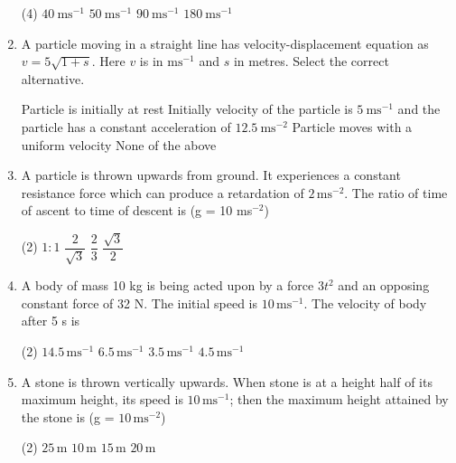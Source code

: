 \documentclass{article}
\renewcommand{\frac}[2]{\dfrac{#1}{#2}}
\begin{document}
\begin{enumerate}
    \begin{tasks}(4)
        \task \(40\ \text{ms}^{-1}\)
        \task \(50\ \text{ms}^{-1}\)
        \task \(90\ \text{ms}^{-1}\)
        \task \(180\ \text{ms}^{-1}\)
    \end{tasks}

    \item A particle moving in a straight line has velocity-displacement equation as \(v = 5\sqrt{1 + s}\). Here \(v\) is in \(\text{ms}^{-1}\) and \(s\) in metres. Select the correct alternative.
    \begin{tasks}
        \task Particle is initially at rest
        \task Initially velocity of the particle is \(5\ \text{ms}^{-1}\) and the particle has a constant acceleration of \(12.5\ \text{ms}^{-2}\)
        \task Particle moves with a uniform velocity
        \task None of the above
    \end{tasks}

    \item A particle is thrown upwards from ground. It experiences a constant resistance force which can produce a retardation of \(2 \, \text{ms}^{-2}\). The ratio of time of ascent to time of descent is (g = 10 ms\(^{-2}\)) 
    \begin{tasks}(2) %
        \task \(1 : 1\)
        \task \( \frac{2}{\sqrt{3}} \)
        \task \(\frac{2}{3}\)
        \task \( \frac{\sqrt{3}}{2} \)
    \end{tasks}
    
    \item A body of mass 10 kg is being acted upon by a force \(3t^2\) and an opposing constant force of 32 N. The initial speed is \(10 \, \text{ms}^{-1}\). The velocity of body after 5 s is
    \begin{tasks}(2)
        \task \(14.5 \, \text{ms}^{-1}\)
        \task \(6.5 \, \text{ms}^{-1}\)
        \task \(3.5 \, \text{ms}^{-1}\)
        \task \(4.5 \, \text{ms}^{-1}\)
    \end{tasks}
    
    \item A stone is thrown vertically upwards. When stone is at a height half of its maximum height, its speed is \(10 \, \text{ms}^{-1}\); then the maximum height attained by the stone is (g = \(10 \, \text{ms}^{-2}\))
    \begin{tasks}(2)
        \task \(25 \, \text{m}\)
        \task \(10 \, \text{m}\)
        \task \(15 \, \text{m}\)
        \task \(20 \, \text{m}\)
    \end{tasks}
    
\end{enumerate}
\end{document}
